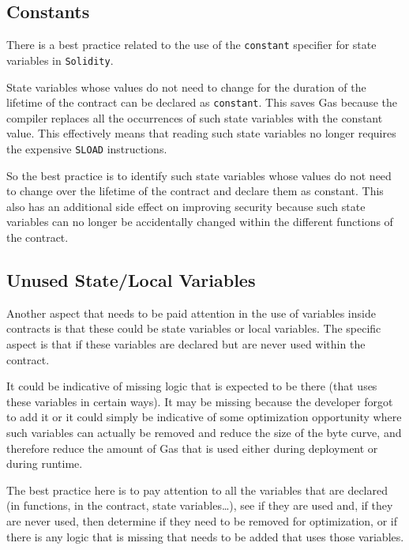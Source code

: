 \subsection{Constants}\label{constants}

There is a best practice related to the use of the \texttt{constant}
specifier for state variables in \texttt{Solidity}.

State variables whose values do not need to change for the duration of
the lifetime of the contract can be declared as \texttt{constant}. This
saves Gas because the compiler replaces all the occurrences of such
state variables with the constant value. This effectively means that
reading such state variables no longer requires the expensive
\texttt{SLOAD} instructions.

So the best practice is to identify such state variables whose values do
not need to change over the lifetime of the contract and declare them as
constant. This also has an additional side effect on improving security
because such state variables can no longer be accidentally changed
within the different functions of the contract.

\subsection{Unused State/Local
Variables}\label{unused-statelocal-variables}

Another aspect that needs to be paid attention in the use of variables
inside contracts is that these could be state variables or local
variables. The specific aspect is that if these variables are declared
but are never used within the contract.

It could be indicative of missing logic that is expected to be there
(that uses these variables in certain ways). It may be missing because
the developer forgot to add it or it could simply be indicative of some
optimization opportunity where such variables can actually be removed
and reduce the size of the byte curve, and therefore reduce the amount
of Gas that is used either during deployment or during runtime.

The best practice here is to pay attention to all the variables that are
declared (in functions, in the contract, state variables\ldots), see if
they are used and, if they are never used, then determine if they need
to be removed for optimization, or if there is any logic that is missing
that needs to be added that uses those variables.
